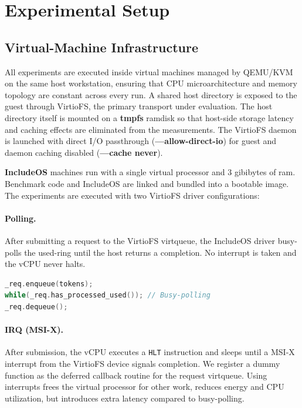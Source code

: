 \documentclass[12pt, a4paper, oneside]{report}
\begin{document}
\section{Experimental Setup}
\label{sec:setup}

\subsection{Virtual-Machine Infrastructure}

All experiments are executed inside virtual machines managed by QEMU/KVM on the
same host workstation, ensuring that CPU microarchitecture and memory topology
are constant across every run.  A shared host directory is exposed to the guest
through VirtioFS, the primary transport under evaluation. The host directory itself is mounted on a \textbf{tmpfs} ramdisk so that host-side storage latency and caching effects are eliminated from the measurements. The VirtioFS daemon is launched with direct I/O passthrough (\textbf{---allow-direct-io}) for guest and daemon caching disabled (\textbf{---cache never}).

\textbf{IncludeOS} machines run with a single virtual processor and 3 gibibytes of ram. Benchmark code and IncludeOS are linked and bundled into a bootable image. The experiments are executed with two VirtioFS driver configurations:

\paragraph{Polling.} After submitting a request to the VirtioFS virtqueue, the
IncludeOS driver busy-polls the used-ring until the host returns
a completion.  No interrupt is taken and the vCPU never halts.

\begin{lstlisting}[caption=Busy-polling,style=chstyle,language=C]
_req.enqueue(tokens);
while(_req.has_processed_used()); // Busy-polling
_req.dequeue();
\end{lstlisting}

\paragraph{IRQ (MSI-X).} After submission, the vCPU executes a \texttt{HLT}
instruction and sleeps until a MSI-X interrupt from the VirtioFS device
signals completion. We register a dummy function as the deferred callback routine for the request virtqueue. Using interrupts frees the virtual processor for other work, reduces energy and CPU utilization, but introduces extra latency compared to busy-polling.
\end{document}

